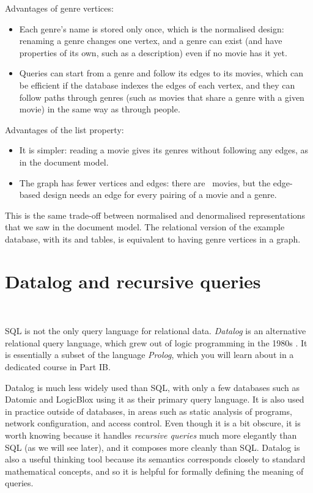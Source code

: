 {    Advantages of genre vertices:
    \begin{itemize}
        \item Each genre's name is stored only once, which is the normalised design: renaming a genre changes one vertex, and a genre can exist (and have properties of its own, such as a description) even if no movie has it yet.
        \item Queries can start from a genre and follow its edges to its movies, which can be efficient if the database indexes the edges of each vertex, and they can follow paths through genres (such as movies that share a genre with a given movie) in the same way as through people.
    \end{itemize}
    Advantages of the list property:
    \begin{itemize}
        \item It is simpler: reading a movie gives its genres without following any edges, as in the document model.
        \item The graph has fewer vertices and edges: there are \graphmovies\ movies, but the edge-based design needs an edge for every pairing of a movie and a genre.
    \end{itemize}
    This is the same trade-off between normalised and denormalised representations that we saw in the document model.
    The relational version of the example database, with its  and  tables, is equivalent to having genre vertices in a graph.
}

\section{Datalog and recursive queries}\label{sec:datalog}

\begin{frame}
    \begin{center}
        {\Large{\color{darkblue}{Datalog and Recursive Queries}}} \\[2em]
        \mydetails
    \end{center}
\end{frame}

SQL is not the only query language for relational data.
\emph{Datalog} is an alternative relational query language, which grew out of logic programming in the 1980s \citep{Ceri1989,Green2013}.
It is essentially a subset of the language \emph{Prolog}, which you will learn about in a dedicated course in Part IB.

Datalog is much less widely used than SQL, with only a few databases such as Datomic and LogicBlox using it as their primary query language.
It is also used in practice outside of databases, in areas such as static analysis of programs, network configuration, and access control.
Even though it is a bit obscure, it is worth knowing because it handles \emph{recursive queries} much more elegantly than SQL (as we will see later), and it composes more cleanly than SQL.
Datalog is also a useful thinking tool because its semantics corresponds closely to standard mathematical concepts, and so it is helpful for formally defining the meaning of queries.

